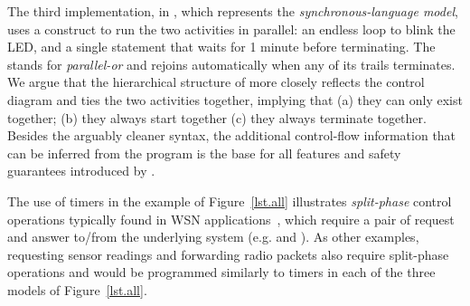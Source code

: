 
The third implementation, in \CEU, which represents the 
\emph{synchronous-language model}, uses a  construct to run the 
two activities in parallel:
an endless loop to blink the LED, and a single statement that waits for 1 
minute before terminating.
The  stands for \emph{parallel-or} and rejoins automatically when 
any of its trails terminates.
%
We argue that the hierarchical structure of \CEU more closely reflects the 
control diagram and ties the two activities together, implying that
(a) they can only exist together;
(b) they always start together
(c) they always terminate together.
%
Besides the arguably cleaner syntax, the additional control-flow information 
that can be inferred from the program is the base for all features and safety 
guarantees introduced by \CEU.


The use of timers in the example of Figure~\ref{lst.all} illustrates 
\emph{split-phase} control operations typically found in WSN 
applications~\cite{wsn.tos}, which require a pair of request and answer 
to/from the underlying system (e.g.  and ).
%
As other examples, requesting sensor readings and forwarding radio packets also 
require split-phase operations and would be programmed similarly to timers in 
each of the three models of Figure~\ref{lst.all}.
